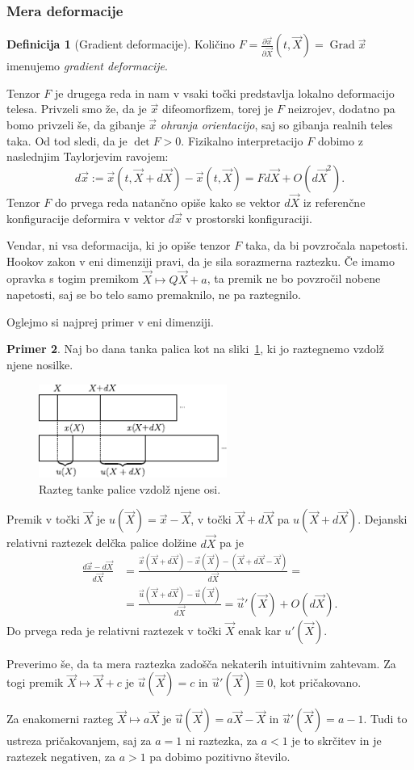 \documentclass[12pt,a4paper]{article}
\theoremstyle{definition} %
\newtheorem{definicija}{Definicija}[section]
\newtheorem{primer}[definicija]{Primer}
\theoremstyle{plain} %
\numberwithin{equation}{section}
\newcommand{\Grad}{\operatorname{Grad}}
\newcommand{\dpar}[2]{\ensuremath{\frac{\partial #1}{\partial #2}}}
\newcommand{\vu}{\vec{u}}
\newcommand{\vX}{\vec{X}}
\newcommand{\vx}{\vec{x}}
\begin{document}
\subsubsection{Mera deformacije}
\begin{definicija}[Gradient deformacije]
  Količino $F = \dpar{\vx}{\vX}(t, \vX) = \Grad \vx$ imenujemo \emph{gradient
  deformacije}.
\end{definicija}

Tenzor $F$ je drugega reda in nam v vsaki točki predstavlja lokalno deformacijo
telesa. Privzeli smo že, da je $\vx$ difeomorfizem, torej je $F$ neizrojev,
dodatno pa bomo privzeli še, da gibanje $\vx$ \emph{ohranja orientacijo}, saj
so gibanja realnih teles taka. Od tod sledi, da je $\det F > 0$.
Fizikalno interpretacijo $F$ dobimo z naslednjim Taylorjevim ravojem:
\[
  d\vx := \vx(t, \vX+d\vX) - \vx(t, \vX) = F d\vX + O(d\vX^2).
\]
Tenzor $F$ do prvega reda natančno opiše kako se vektor $d\vX$ iz referenčne
konfiguracije deformira v vektor $d\vx$ v prostorski konfiguraciji.

Vendar, ni vsa deformacija, ki jo opiše tenzor $F$ taka, da bi povzročala
napetosti. Hookov zakon v eni dimenziji pravi, da je sila sorazmerna raztezku.
Če imamo opravka s togim premikom $\vX \mapsto Q\vX + a$, ta premik ne bo povzročil
nobene napetosti, saj se bo telo samo premaknilo, ne pa raztegnilo.

Oglejmo si najprej primer v eni dimenziji.
\begin{primer}
Naj bo dana tanka palica kot na sliki~\ref{fig:palica}, ki jo raztegnemo vzdolž
njene nosilke.
\begin{figure}[h]
  \centering
  \includegraphics[width=0.55\textwidth]{images/stretch1d.pdf}
  \caption{Razteg tanke palice vzdolž njene osi.}
  \label{fig:palica}
\end{figure}
Premik v točki $\vX$ je $u(\vX) = \vx - \vX$, v točki $\vX+d\vX$ pa $u(\vX+d\vX)$.
Dejanski relativni raztezek delčka palice dolžine $d\vX$ pa je
\begin{align*}
  \frac{d\vx - d\vX}{d\vX} &= \frac{\vx(\vX+d\vX) - \vx(\vX) - (\vX + d\vX - \vX)}{d\vX} = \\ &=
  \frac{\vu(\vX + d\vX) - \vu(\vX)}{d\vX} = \vu'(\vX) + O(d\vX).
\end{align*}
Do prvega reda je relativni raztezek v točki $\vX$ enak kar $u'(\vX)$.

Preverimo še, da ta mera raztezka zadošča nekaterih intuitivnim zahtevam. Za
togi premik $\vX \mapsto \vX + c$ je $\vu(\vX) = c$ in $\vu'(\vX) \equiv 0$, kot
pričakovano.

Za enakomerni razteg $\vX \mapsto a\vX$ je $\vu(\vX) = a\vX - \vX$ in $\vu'(\vX) = a - 1$. Tudi
to ustreza pričakovanjem, saj za $a = 1$ ni raztezka, za $a< 1$ je to skrčitev
in je raztezek negativen, za $a>1$ pa dobimo pozitivno število.
\end{primer}
\end{document}
